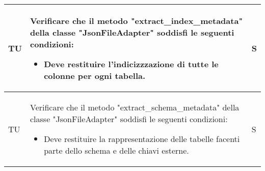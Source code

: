 \begin{adjustwidth}{-0.5cm}{-0.5cm}
\begin{longtable}{|P{1.5cm}|>{\raggedright}P{9.5cm}|>{\arraybackslash}P{1.5cm}|}
		\hline TU & Verificare che il metodo "extract\_index\_metadata" della classe "JsonFileAdapter" soddisfi le seguenti condizioni:
	\begin{itemize}
		\item Deve restituire l'indicizzzazione di tutte le colonne per ogni tabella.
	\end{itemize} & S \\

		\hline TU & Verificare che il metodo "extract\_schema\_metadata" della classe "JsonFileAdapter" soddisfi le seguenti condizioni:
	\begin{itemize}
		\item Deve restituire la rappresentazione delle tabelle facenti parte dello schema e delle chiavi esterne.
	\end{itemize} & S \\


\end{longtable}
\end{adjustwidth}

